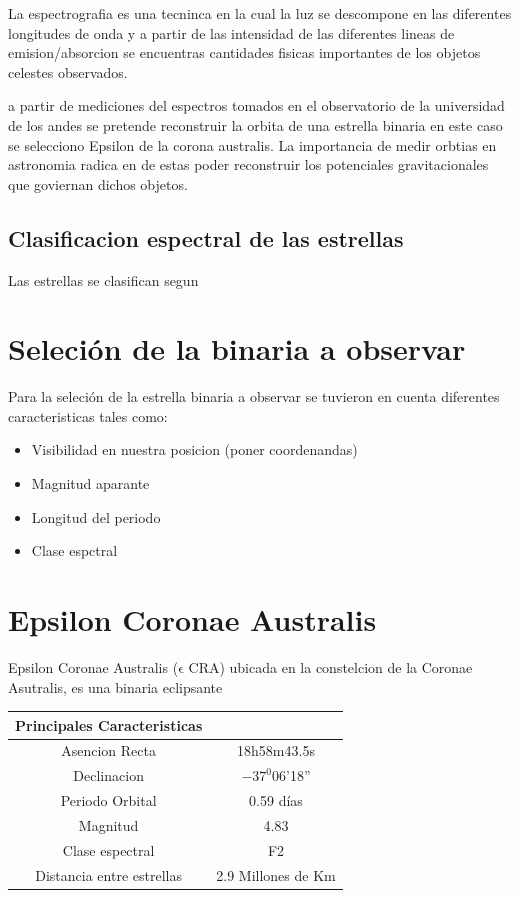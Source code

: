 \documentclass[Proceedings]{ascelike}
\begin{document}
La espectrografia es una tecninca en la cual la luz se descompone en las diferentes
longitudes de onda y a partir de las intensidad de las diferentes lineas de emision/absorcion
se encuentras cantidades fisicas importantes de los objetos celestes observados.

a partir de mediciones del espectros tomados en el observatorio de la universidad 
de los andes se pretende reconstruir la orbita de una estrella binaria en este caso 
se selecciono Epsilon de la corona australis. La importancia de medir orbtias en astronomia
radica en de estas poder reconstruir los potenciales gravitacionales que goviernan 
dichos objetos.

\subsection{Clasificacion espectral de las estrellas}

Las estrellas se clasifican segun

\section{Seleci\'on de la binaria a observar}

Para la seleci\'on de la estrella binaria a observar se tuvieron en cuenta 
diferentes caracteristicas tales como:

\begin{itemize}
\item Visibilidad en nuestra posicion (poner coordenandas)
\item Magnitud aparante
\item Longitud del periodo
\item Clase espctral
\end{itemize}


\section{Epsilon Coronae Australis}

Epsilon Coronae Australis ($\mathrm{\epsilon}$ CRA) ubicada en la 
constelcion de la Coronae Asutralis, es una binaria eclipsante \\

\begin{tabular}{c c}
\hline
Principales Caracteristicas\\
\hline
\hline
Asencion Recta & 18h58m43.5s \\
Declinacion & $-37^{0}$06'18'' \\
Periodo Orbital & 0.59 d\'ias \\
Magnitud & 4.83 \\
Clase espectral & F2 \\
Distancia entre estrellas & 2.9 Millones de Km\\ 
\hline
\hline
\end{tabular}
\end{document}

